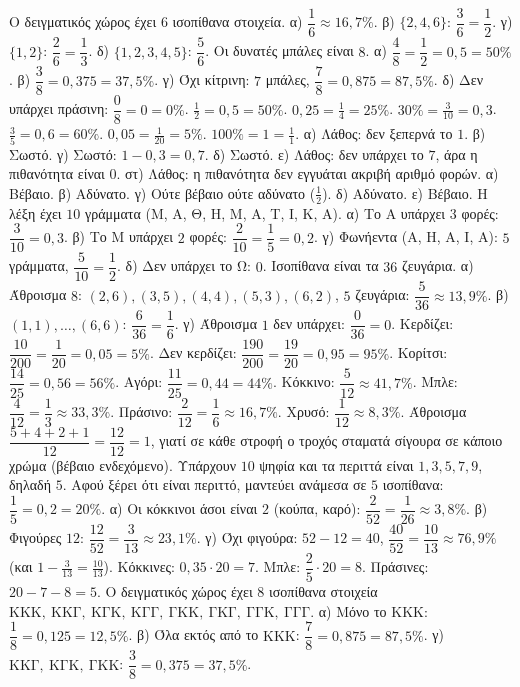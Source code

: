  Ο δειγματικός χώρος έχει $6$ ισοπίθανα στοιχεία. α) $\dfrac{1}{6}\approx16{,}7\%$. β) $\{2,4,6\}$: $\dfrac{3}{6}=\dfrac{1}{2}$. γ) $\{1,2\}$: $\dfrac{2}{6}=\dfrac{1}{3}$. δ) $\{1,2,3,4,5\}$: $\dfrac{5}{6}$.
 Οι δυνατές μπάλες είναι $8$. α) $\dfrac{4}{8}=\dfrac{1}{2}=0{,}5=50\%$. β) $\dfrac{3}{8}=0{,}375=37{,}5\%$. γ) Όχι κίτρινη: $7$ μπάλες, $\dfrac{7}{8}=0{,}875=87{,}5\%$. δ) Δεν υπάρχει πράσινη: $\dfrac{0}{8}=0=0\%$.
 $\frac{1}{2}=0{,}5=50\%$. $0{,}25=\frac{1}{4}=25\%$. $30\%=\frac{3}{10}=0{,}3$. $\frac{3}{5}=0{,}6=60\%$. $0{,}05=\frac{1}{20}=5\%$. $100\%=1=\frac{1}{1}$.
 α) Λάθος: δεν ξεπερνά το $1$. β) Σωστό. γ) Σωστό: $1-0{,}3=0{,}7$. δ) Σωστό. ε) Λάθος: δεν υπάρχει το $7$, άρα η πιθανότητα είναι $0$. στ) Λάθος: η πιθανότητα δεν εγγυάται ακριβή αριθμό φορών.
 α) Βέβαιο. β) Αδύνατο. γ) Ούτε βέβαιο ούτε αδύνατο ($\frac{1}{2}$). δ) Αδύνατο. ε) Βέβαιο.
 Η λέξη έχει $10$ γράμματα (Μ, Α, Θ, Η, Μ, Α, Τ, Ι, Κ, Α). α) Το Α υπάρχει $3$ φορές: $\dfrac{3}{10}=0{,}3$. β) Το Μ υπάρχει $2$ φορές: $\dfrac{2}{10}=\dfrac{1}{5}=0{,}2$. γ) Φωνήεντα (Α, Η, Α, Ι, Α): $5$ γράμματα, $\dfrac{5}{10}=\dfrac{1}{2}$. δ) Δεν υπάρχει το Ω: $0$.
 Ισοπίθανα είναι τα $36$ ζευγάρια. α) Άθροισμα $8$: $(2,6),(3,5),(4,4),(5,3),(6,2)$, $5$ ζευγάρια: $\dfrac{5}{36}\approx13{,}9\%$. β) $(1,1),\dots,(6,6)$: $\dfrac{6}{36}=\dfrac{1}{6}$. γ) Άθροισμα $1$ δεν υπάρχει: $\dfrac{0}{36}=0$.
 Κερδίζει: $\dfrac{10}{200}=\dfrac{1}{20}=0{,}05=5\%$. Δεν κερδίζει: $\dfrac{190}{200}=\dfrac{19}{20}=0{,}95=95\%$.
 Κορίτσι: $\dfrac{14}{25}=0{,}56=56\%$. Αγόρι: $\dfrac{11}{25}=0{,}44=44\%$.
 Κόκκινο: $\dfrac{5}{12}\approx41{,}7\%$. Μπλε: $\dfrac{4}{12}=\dfrac{1}{3}\approx33{,}3\%$. Πράσινο: $\dfrac{2}{12}=\dfrac{1}{6}\approx16{,}7\%$. Χρυσό: $\dfrac{1}{12}\approx8{,}3\%$. Άθροισμα $\dfrac{5+4+2+1}{12}=\dfrac{12}{12}=1$, γιατί σε κάθε στροφή ο τροχός σταματά σίγουρα σε κάποιο χρώμα (βέβαιο ενδεχόμενο).
 Υπάρχουν $10$ ψηφία και τα περιττά είναι $1,3,5,7,9$, δηλαδή $5$. Αφού ξέρει ότι είναι περιττό, μαντεύει ανάμεσα σε $5$ ισοπίθανα: $\dfrac{1}{5}=0{,}2=20\%$.
 α) Οι κόκκινοι άσοι είναι $2$ (κούπα, καρό): $\dfrac{2}{52}=\dfrac{1}{26}\approx3{,}8\%$. β) Φιγούρες $12$: $\dfrac{12}{52}=\dfrac{3}{13}\approx23{,}1\%$. γ) Όχι φιγούρα: $52-12=40$, $\dfrac{40}{52}=\dfrac{10}{13}\approx76{,}9\%$ (και $1-\frac{3}{13}=\frac{10}{13}$).
 Κόκκινες: $0{,}35\cdot20=7$. Μπλε: $\dfrac{2}{5}\cdot20=8$. Πράσινες: $20-7-8=5$.
 Ο δειγματικός χώρος έχει $8$ ισοπίθανα στοιχεία $\mathrm{ΚΚΚ},\ \mathrm{ΚΚΓ},\ \mathrm{ΚΓΚ},\ \mathrm{ΚΓΓ},\ \mathrm{ΓΚΚ},\ \mathrm{ΓΚΓ},\ \mathrm{ΓΓΚ},\ \mathrm{ΓΓΓ}$. α) Μόνο το $\mathrm{ΚΚΚ}$: $\dfrac{1}{8}=0{,}125=12{,}5\%$. β) Όλα εκτός από το $\mathrm{ΚΚΚ}$: $\dfrac{7}{8}=0{,}875=87{,}5\%$. γ) $\mathrm{ΚΚΓ},\ \mathrm{ΚΓΚ},\ \mathrm{ΓΚΚ}$: $\dfrac{3}{8}=0{,}375=37{,}5\%$.
